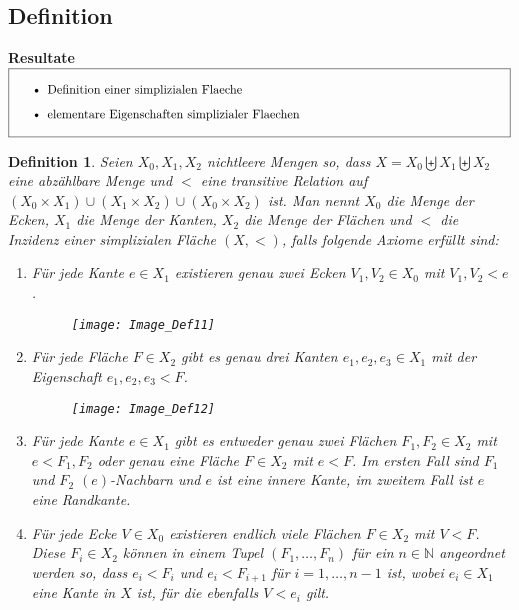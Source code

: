 \documentclass[12pt,titlepage,twoside,cleardoublepage]{article}
\theoremstyle{nummermitklammern}
\newtheorem{definition}[temp]{Definition}
\newtheorem{definition}[zahl]{Definition}
\numberwithin{equation}{section}
\begin{document}
\subsection{Definition}
\textbf{Resultate} \\
$\fbox{
\parbox{14cm}{\begin{itemize}
\item Definition einer simplizialen Flaeche 
\item elementare Eigenschaften simplizialer Flaechen
\end{itemize}
}}$\\
\begin{definition}  \label{def1} 
Seien $X_0,X_1,X_2$ nichtleere Mengen so, dass $X=X_{0} \biguplus X_{1} \biguplus X_{2}$ eine abzählbare Menge und $<$ eine transitive Relation auf  $(X_{0}\times X_{1}) \cup (X_{1}\times X_{2})\cup (X_{0}\times X_{2})$ ist.
 Man nennt $X_{0}$ \emph{die Menge der Ecken}, $X_{1}$ \emph{die Menge der Kanten}, $X_{2}$ \emph{die Menge der Flächen} und $<$ die \emph{Inzidenz} einer \emph{simplizialen Fläche} $(X,<)$, falls folgende Axiome erfüllt sind:
 \begin{enumerate}
\item Für jede Kante $e \in X_{1}$ existieren genau zwei Ecken $V_1,V_2 \in X_{0}$ mit $V_1,V_2 < e$. 
\begin{figure}[H]
\begin{center}
\texttt{[image: Image\_Def11]}
\end{center}
\end{figure}
\item Für jede Fläche $F\in X_2$ gibt es genau drei Kanten $e_1,e_2,e_3 \in X_{1}$ mit der Eigenschaft $e_1,e_2,e_3 < F$.
\begin{figure}[H]
\begin{center}
\texttt{[image: Image\_Def12]}
\end{center}
\end{figure} 
\item Für jede Kante $e \in X_{1}$ gibt es entweder genau zwei Flächen $F_{1},F_{2} \in X_{2}$ mit $e <F_{1},F_2$ oder
genau eine Fläche $F \in X_{2}$ mit $e < F$. Im ersten Fall sind $F_{1}$ und $F_{2}$ \emph{$(e)$-Nachbarn} und $e$ ist eine \emph{innere Kante}, im zweitem Fall ist $e$ eine \emph{Randkante}. 
 \item Für jede Ecke $V \in X_{0}$ existieren endlich viele Flächen $F\in X_{2}$ mit $V < F$.
  Diese $F_{i}\in X_2$ können in einem Tupel $(F_{1},\ldots,F_{n})$ für ein $n \in \mathbb{N}$ angeordnet werden so, dass $e_i<F_{i}$ und $e_i<F_{i+1}$ für $i=1,\ldots,n-1$ ist, wobei $e_i\in X_1$ eine Kante  in $X$ ist, für die ebenfalls $V<e_i$ gilt. 

\end{enumerate}
\end{definition}
\end{document}

